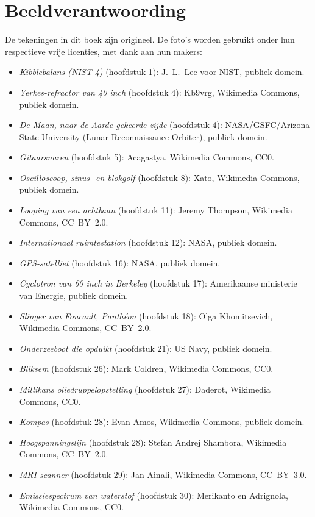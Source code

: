 \chapter*{Beeldverantwoording}

De tekeningen in dit boek zijn origineel. De foto's worden gebruikt
onder hun respectieve vrije licenties, met dank aan hun makers:

\begin{itemize}
  \item \emph{Kibblebalans (NIST-4)} (hoofdstuk 1): J.~L.~Lee voor
        NIST, publiek domein.
  \item \emph{Yerkes-refractor van 40 inch} (hoofdstuk 4): Kb9vrg,
        Wikimedia Commons, publiek domein.
  \item \emph{De Maan, naar de Aarde gekeerde zijde} (hoofdstuk 4):
        NASA/GSFC/Arizona State University (Lunar Reconnaissance
        Orbiter), publiek domein.
  \item \emph{Gitaarsnaren} (hoofdstuk 5): Acagastya, Wikimedia
        Commons, CC0.
  \item \emph{Oscilloscoop, sinus- en blokgolf} (hoofdstuk 8): Xato,
        Wikimedia Commons, publiek domein.
  \item \emph{Looping van een achtbaan} (hoofdstuk 11): Jeremy
        Thompson, Wikimedia Commons, CC~BY~2.0.
  \item \emph{Internationaal ruimtestation} (hoofdstuk 12): NASA,
        publiek domein.
  \item \emph{GPS-satelliet} (hoofdstuk 16): NASA, publiek domein.
  \item \emph{Cyclotron van 60 inch in Berkeley} (hoofdstuk 17):
        Amerikaanse ministerie van Energie, publiek domein.
  \item \emph{Slinger van Foucault, Panthéon} (hoofdstuk 18): Olga
        Khomitsevich, Wikimedia Commons, CC~BY~2.0.
  \item \emph{Onderzeeboot die opduikt} (hoofdstuk 21): US Navy,
        publiek domein.
  \item \emph{Bliksem} (hoofdstuk 26): Mark Coldren, Wikimedia
        Commons, CC0.
  \item \emph{Millikans oliedruppelopstelling} (hoofdstuk 27):
        Daderot, Wikimedia Commons, CC0.
  \item \emph{Kompas} (hoofdstuk 28): Evan-Amos, Wikimedia Commons,
        publiek domein.
  \item \emph{Hoogspanningslijn} (hoofdstuk 28): Stefan Andrej
        Shambora, Wikimedia Commons, CC~BY~2.0.
  \item \emph{MRI-scanner} (hoofdstuk 29): Jan Ainali, Wikimedia
        Commons, CC~BY~3.0.
  \item \emph{Emissiespectrum van waterstof} (hoofdstuk 30):
        Merikanto en Adrignola, Wikimedia Commons, CC0.
\end{itemize}

